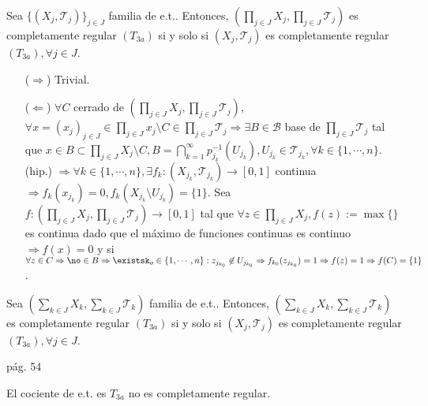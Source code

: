 \begin{prop}
  Sea $\{ ( X_{j}, \mathcal{T}_{j} ) \}_{j \in J}$ familia de e.t.. Entonces, $( \prod_{j \in J} X_{j}, \prod_{j \in J} \mathcal{T}_{j} )$ es completamente regular $(T_{3a})$ si y solo si $ ( X_{j}, \mathcal{T}_{j} )$ es completamente regular $(T_{3a}), \forall j \in J$.
\end{prop}

\begin{dem}
  \begin{enumerate}[label=(\roman*)]
    \item [($\Rightarrow$)] Trivial.
    \item [($\Leftarrow$)] $\forall C$ cerrado de $( \prod_{j \in J} X_{j}, \prod_{j \in J} \mathcal{T}_{j} )$, $\forall x = ( x_{j} )_{j \in J} \in \prod_{j \in J} x_{j} \setminus C \in \prod_{j \in J} \mathcal{T}_{j} \Rightarrow \exists B \in \mathcal{B}$ base de $\prod_{j \in J} \mathcal{T}_{j}$ tal que $x \in B \subset \prod_{j \in J} X_{j} \setminus C, B = \bigcap_{k = 1}^{\infty} p_{j_{k}}^{-1}(U_{j_{k}}), U_{j_{k}} \in \mathcal{T}_{j_{k}}, \forall k \in \{  1, \cdots, n \}$. (hip.) $\Rightarrow \forall k \in \{ 1, \cdots, n \}, \exists f_{k}: ( X_{j_{k}}, \mathcal{T}_{j_{k}} ) \to [0, 1]$ continua $\Rightarrow f_{k}(x_{j_{k}}) = 0, f_{k}(X_{j_{k}} \setminus U_{j_{k}}) = \{  1 \}$. Sea $f: ( \prod_{j \in J} X_{j}, \prod_{j \in J} \mathcal{T}_{j} ) \to [0, 1]$ tal que $\forall z \in \prod_{j \in J} X_{j}, f(z) := \max \big\{  \big\}$ es continua dado que el máximo de funciones continuas es continuo $\Rightarrow f(x) = 0$ y si $\forall z \in C \Rightarrow \no \in B \Rightarrow \existsk_{o} \in \{ 1, \cdots , n \} : z_{j_{k_{0}}} \not \in U_{j_{k_{0}}} \Rightarrow f_{k_{0}}(z_{j_{k_{0}}}) = 1 \Rightarrow f(z) = 1 \Rightarrow f(C) = \{ 1 \}$.
\end{enumerate}
\end{dem}

\begin{prop}
  Sea $( \sum_{k \in J} X_{k}, \sum_{k \in J} \mathcal{T}_{k})$ familia de e.t.. Entonces, $( \sum_{k \in J} X_{k}, \sum_{k \in J} \mathcal{T}_{k})$ es completamente regular $(T_{3a})$ si y solo si $ ( X_{j}, \mathcal{T}_{j} )$ es completamente regular $(T_{3a}), \forall j \in J$.
\end{prop}

\begin{dem}
  pág. 54
\end{dem}

\begin{obs}
  El cociente de e.t. es $T_{3a}$ no es completamente regular.
\end{obs}


